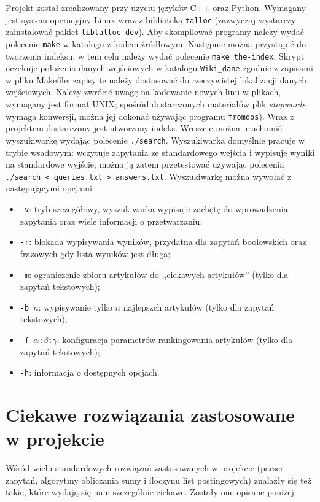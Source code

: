 \documentclass[a4paper,12pt]{article}
\begin{document}
Projekt został zrealizowany przy użyciu języków C++ oraz Python. Wymagany jest
system operacyjny Linux wraz z biblioteką \texttt{talloc} (zazwyczaj wystarczy
zainstalować pakiet \texttt{libtalloc-dev}). Aby skompilować programy należy
wydać polecenie \texttt{make} w katalogu z kodem źródłowym. Następnie można
przystąpić do tworzenia indeksu: w tem celu należy wydać polecenie
\texttt{make the-index}. Skrypt oczekuje położenia danych wejściowych w katalogu
\texttt{Wiki\_dane} zgodnie z zapisami w pliku Makefile; zapisy te należy
dostosować do rzeczywistej lokalizacji danych wejściowych. Należy zwrócić uwagę
na kodowanie nowych linii w plikach, wymagany jest format UNIX; spośród
dostarczonych materiałów plik \textit{stopwords} wymaga konwersji, można jej
dokonać używając programu \texttt{fromdos}). Wraz z projektem dostarczony jest
utworzony indeks. Wreszcie można uruchomić wyszukiwarkę wydając polecenie
\texttt{./search}. Wyszukiwarka domyślnie pracuje w trybie wsadowym: wczytuje
zapytania ze standardowego wejścia i wypisuje wyniki na standardowe wyjście;
można ją zatem przetestować używając polecenia \texttt{./search < queries.txt > answers.txt}.
Wyszukiwarkę można wywołać z następującymi opcjami:\begin{itemize}
  \item \texttt{-v}: tryb szczegółowy, wyszukiwarka wypisuje zachętę do
  wprowadzenia zapytania oraz wiele informacji o przetwarzaniu;
  \item \texttt{-r}: blokada wypisywania wyników, przydatna dla zapytań
  boolowskich oraz frazowych gdy lista wyników jest długa;
  \item \texttt{-m}: ograniczenie zbioru artykułów do ,,ciekawych artykułów''
  (tylko dla zapytań tekstowych);
  \item \texttt{-b $n$}: wypisywanie tylko $n$ najlepszch artykułów
  (tylko dla zapytań tekstowych);
  \item \texttt{-f $\alpha$:$\beta$:$\gamma$}: konfiguracja parametrów
  rankingowania artykułów (tylko dla zapytań tekstowych);
  \item \texttt{-h}: informacja o dostępnych opcjach.
\end{itemize}

\section{Ciekawe rozwiązania zastosowane w projekcie}
Wśród wielu standardowych rozwiązań zastosowanych w projekcie (parser zapytań,
algorytmy obliczania sumy i iloczynu list postingowych) znalazły się też takie,
które wydają się nam szczególnie ciekawe. Zostały one opisane poniżej.
\end{document}
